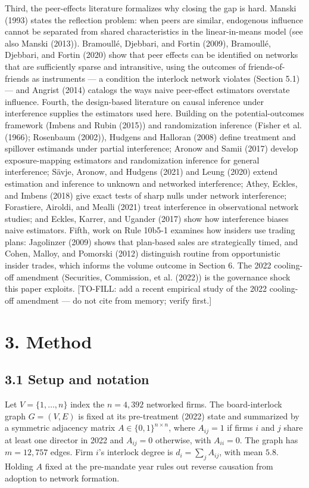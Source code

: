 \documentclass[
  a4paper,
]{article}
\begin{document}
Third, the peer-effects literature formalizes why closing the gap is
hard. Manski (1993) states the reflection problem: when peers are
similar, endogenous influence cannot be separated from shared
characteristics in the linear-in-means model (see also Manski (2013)).
Bramoullé, Djebbari, and Fortin (2009), Bramoullé, Djebbari, and Fortin
(2020) show that peer effects can be identified on networks that are
sufficiently sparse and intransitive, using the outcomes of
friends-of-friends as instruments --- a condition the interlock network
violates (Section 5.1) --- and Angrist (2014) catalogs the ways naive
peer-effect estimators overstate influence. Fourth, the design-based
literature on causal inference under interference supplies the
estimators used here. Building on the potential-outcomes framework
(Imbens and Rubin (2015)) and randomization inference (Fisher et al.
(1966); Rosenbaum (2002)), Hudgens and Halloran (2008) define treatment
and spillover estimands under partial interference; Aronow and Samii
(2017) develop exposure-mapping estimators and randomization inference
for general interference; Sävje, Aronow, and Hudgens (2021) and Leung
(2020) extend estimation and inference to unknown and networked
interference; Athey, Eckles, and Imbens (2018) give exact tests of sharp
nulls under network interference; Forastiere, Airoldi, and Mealli (2021)
treat interference in observational network studies; and Eckles, Karrer,
and Ugander (2017) show how interference biases naive estimators. Fifth,
work on Rule 10b5-1 examines how insiders use trading plans: Jagolinzer
(2009) shows that plan-based sales are strategically timed, and Cohen,
Malloy, and Pomorski (2012) distinguish routine from opportunistic
insider trades, which informs the volume outcome in Section 6. The 2022
cooling-off amendment (Securities, Commission, et al. (2022)) is the
governance shock this paper exploits. {[}TO-FILL: add a recent empirical
study of the 2022 cooling-off amendment --- do not cite from memory;
verify first.{]}

\section{3. Method}\label{methodology-exposure-reconstruction}

\subsection{3.1 Setup and notation}\label{setup-and-notation}

Let \(V = \{1, \dots, n\}\) index the \(n = 4{,}392\) networked firms.
The board-interlock graph \(G = (V, E)\) is fixed at its pre-treatment
(2022) state and summarized by a symmetric adjacency matrix
\(A \in \{0,1\}^{n \times n}\), where \(A_{ij} = 1\) if firms \(i\) and
\(j\) share at least one director in 2022 and \(A_{ij} = 0\) otherwise,
with \(A_{ii} = 0\). The graph has \(m = 12{,}757\) edges. Firm \(i\)'s
interlock degree is \(d_i = \sum_{j} A_{ij}\), with mean \(5.8\).
Holding \(A\) fixed at the pre-mandate year rules out reverse causation
from adoption to network formation.
\end{document}

